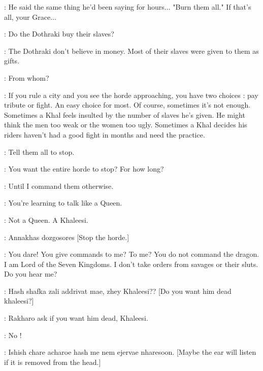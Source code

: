 \JAIME: He said the same thing he'd been saying for hours$\ldots$ "Burn them all." If that's all, your Grace$\ldots$ 

\scene



\DAENERYS: Do the Dothraki buy their slaves? 

\JORAH: The Dothraki don't believe in money. Most of their slaves were given to them as gifts. 

\DAENERYS: From whom? 

\JORAH: If you rule a city and you see the horde approaching, you have two choices : pay tribute or fight. An easy choice for most. Of course, sometimes it's not enough. Sometimes a Khal feels insulted by the number of slaves he's given. He might think the men too weak or the women too ugly. Sometimes a Khal decides his riders haven't had a good fight in months and need the practice. 


\DAENERYS: Tell them all to stop. 

\JORAH: You want the entire horde to stop? For how long? 

\DAENERYS: Until I command them otherwise. 

\JORAH: You're learning to talk like a Queen. 

\DAENERYS: Not a Queen. A Khaleesi. 

\JORAH: Annakhas dozgosores [Stop the horde.]


\VISERYS: You dare! You give commands to me? To me?  You do not command the dragon. I am Lord of the Seven Kingdoms. I don't take orders from savages or their sluts. Do you hear me? 


\RAKHARO: Hash shafka zali addrivat mae, zhey Khaleesi?? [Do you want him dead khaleesi?]

\IRRI: Rakharo ask if you want him dead, Khaleesi. 

\DAENERYS: No ! 

\RAKHARO: Ishish chare acharoe hash me nem ejervae nharesoon. [Maybe the ear will listen if it is removed from the head.]

